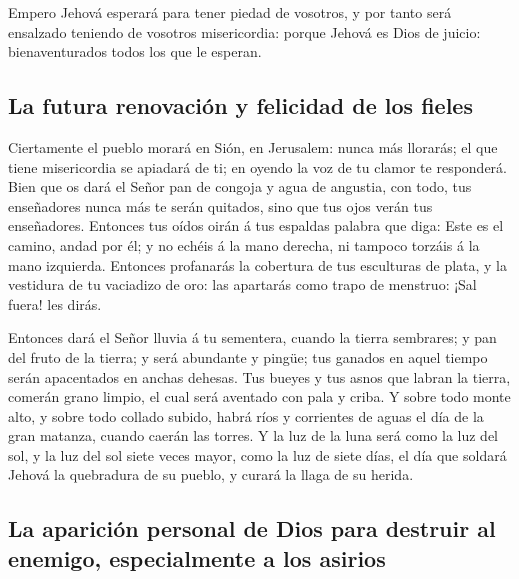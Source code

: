  Empero Jehová esperará para tener piedad de vosotros, y
por tanto será ensalzado teniendo de vosotros misericordia: porque
Jehová es Dios de juicio: bienaventurados todos los que le esperan.

\hypertarget{la-futura-renovaciuxf3n-y-felicidad-de-los-fieles}{%
\subsection{La futura renovación y felicidad de los
fieles}\label{la-futura-renovaciuxf3n-y-felicidad-de-los-fieles}}

 Ciertamente el pueblo morará en Sión, en Jerusalem: nunca
más llorarás; el que tiene misericordia se apiadará de ti; en oyendo la
voz de tu clamor te responderá.  Bien que os dará el Señor
pan de congoja y agua de angustia, con todo, tus enseñadores nunca más
te serán quitados, sino que tus ojos verán tus enseñadores.
 Entonces tus oídos oirán á tus espaldas palabra que diga:
Este es el camino, andad por él; y no echéis á la mano derecha, ni
tampoco torzáis á la mano izquierda.  Entonces profanarás
la cobertura de tus esculturas de plata, y la vestidura de tu vaciadizo
de oro: las apartarás como trapo de menstruo: ¡Sal fuera! les dirás.

 Entonces dará el Señor lluvia á tu sementera, cuando la
tierra sembrares; y pan del fruto de la tierra; y será abundante y
pingüe; tus ganados en aquel tiempo serán apacentados en anchas dehesas.
 Tus bueyes y tus asnos que labran la tierra, comerán grano
limpio, el cual será aventado con pala y criba.  Y sobre
todo monte alto, y sobre todo collado subido, habrá ríos y corrientes de
aguas el día de la gran matanza, cuando caerán las torres. 
Y la luz de la luna será como la luz del sol, y la luz del sol siete
veces mayor, como la luz de siete días, el día que soldará Jehová la
quebradura de su pueblo, y curará la llaga de su herida.

\hypertarget{la-apariciuxf3n-personal-de-dios-para-destruir-al-enemigo-especialmente-a-los-asirios}{%
\subsection{La aparición personal de Dios para destruir al enemigo,
especialmente a los
asirios}\label{la-apariciuxf3n-personal-de-dios-para-destruir-al-enemigo-especialmente-a-los-asirios}}

